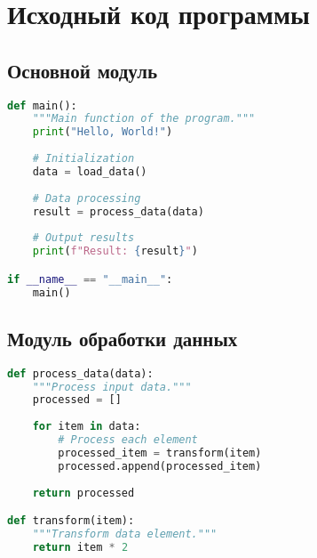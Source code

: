 \chapter{Исходный код программы}

\section{Основной модуль}

\begin{lstlisting}[language=Python, caption={Основной модуль программы}]
def main():
    """Main function of the program."""
    print("Hello, World!")
    
    # Initialization
    data = load_data()
    
    # Data processing
    result = process_data(data)
    
    # Output results
    print(f"Result: {result}")

if __name__ == "__main__":
    main()
\end{lstlisting}

\section{Модуль обработки данных}

\begin{lstlisting}[language=Python, caption={Модуль обработки данных}]
def process_data(data):
    """Process input data."""
    processed = []
    
    for item in data:
        # Process each element
        processed_item = transform(item)
        processed.append(processed_item)
    
    return processed

def transform(item):
    """Transform data element."""
    return item * 2
\end{lstlisting}
